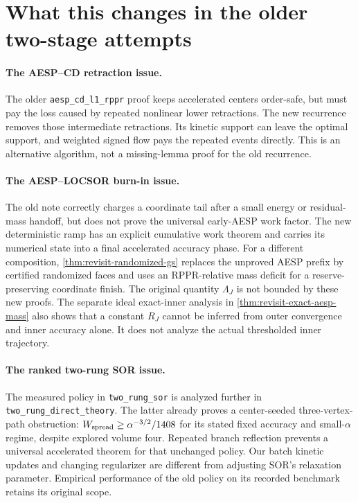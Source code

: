 \section{What this changes in the older two-stage attempts}
\paragraph{The AESP--CD retraction issue.}
The older \texttt{aesp\_cd\_l1\_rppr} proof keeps accelerated centers
order-safe, but must pay the loss caused by repeated nonlinear lower
retractions. The new recurrence removes those intermediate retractions.
Its kinetic support can leave the optimal support, and weighted signed
flow pays the repeated events directly. This is an alternative algorithm,
not a missing-lemma proof for the old recurrence.

\paragraph{The AESP--LOCSOR burn-in issue.}
The old note correctly charges a coordinate tail after a small energy or
residual-mass handoff, but does not prove the universal early-AESP work
factor. The new deterministic ramp has an explicit cumulative work theorem
and carries its numerical state into a final accelerated accuracy phase.
For a different composition, \cref{thm:revisit-randomized-gs} replaces the
unproved AESP prefix by certified randomized faces and uses an RPPR-relative
mass deficit for a reserve-preserving coordinate finish. The original
quantity $\Lambda_J$ is not bounded by these new proofs.
The separate ideal exact-inner analysis in
\cref{thm:revisit-exact-aesp-mass} also shows that a constant $R_J$
cannot be inferred from outer convergence and inner accuracy alone.
It does not analyze the actual thresholded inner trajectory.

\paragraph{The ranked two-rung SOR issue.}
The measured policy in \texttt{two\_rung\_sor} is analyzed further in
\texttt{two\_rung\_direct\_theory}. The latter already proves a
center-seeded three-vertex-path obstruction:
$W_{\rm spread}\geq\alpha^{-3/2}/1408$ for its stated fixed accuracy and
small-$\alpha$ regime, despite explored volume four. Repeated branch
reflection prevents a universal accelerated theorem for that unchanged
policy. Our batch kinetic updates and changing regularizer are different
from adjusting SOR's relaxation parameter. Empirical performance of the
old policy on its recorded benchmark retains its original scope.

